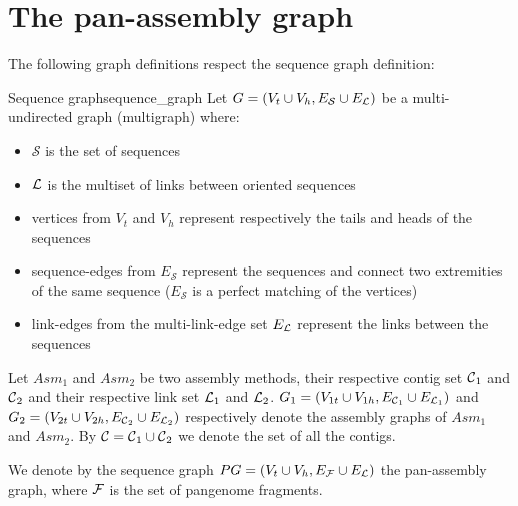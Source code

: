\section{The pan-assembly graph}

The following graph definitions respect the sequence graph definition:

\begin{definition}
  {Sequence graph}{sequence_graph} Let
  \(G = (V_{t}\cup V_{h}, E_{\mathcal{S}} \cup E_{\mathcal{L}}{})\) be a multi-undirected
  graph (multigraph) where:

  \begin{itemize}
    \item \(\mathcal{S}\) is the set of sequences

    \item \(\mathcal{L}{}\) is the multiset of links between oriented sequences

    \item vertices from \(V_{t}\) and \(V_{h}\) represent respectively the tails
      and heads of the sequences

    \item sequence-edges from \(E_{\mathcal{S}}\) represent the sequences and connect
      two extremities of the same sequence (\(E_{\mathcal{S}}\) is a perfect
      matching of the vertices)

    \item link-edges from the multi-link-edge set \(E_{\mathcal{L}}{}\) represent
      the links between the sequences
  \end{itemize}
\end{definition}

Let \(Asm_{1}\) and \(Asm_{2}\) be two assembly methods, their respective contig set \(\mathcal{C}{}_{1}\) and \(\mathcal{C}{}_{2}\) and their respective link set \(\mathcal{L}{}_{1}\) and \(\mathcal{L}{}_{2}\).
\(G_{1}= (V_{1t}\cup V_{1h}, E_{\mathcal{C}{}_1}\cup E_{\mathcal{L}{}_1})\) and \(G_{2}= (V_{2t}\cup V_{2h}, E_{\mathcal{C}{}_2}\cup E_{\mathcal{L}{}_2})\) respectively denote the assembly graphs of \(Asm_{1}\) and \(Asm_{2}\). By \(\mathcal{C}{} = \mathcal{C}{}_1 \cup \mathcal{C}{}_2\) we denote the set of all the contigs.

We denote by the sequence graph \(PG = (V_t \cup V_h, E_{\mathcal{F}}{} \cup E_{\mathcal{L}}{})\) the pan-assembly graph, where \(\mathcal{F}{}\) is the set of pangenome fragments.





